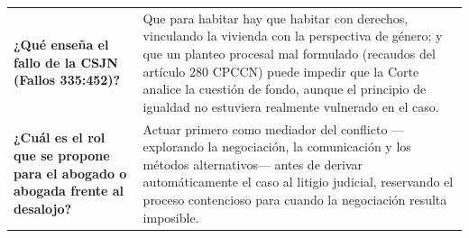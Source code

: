 \documentclass[12pt,oneside]{book}
\begin{document}
\begin{longtable}{
    >{\raggedright\arraybackslash}p{}
    >{\raggedright\arraybackslash}p{}
}
\textbf{¿Qué enseña el fallo de la CSJN (Fallos 335:452)?} &
Que para habitar hay que habitar con derechos, vinculando la vivienda con la perspectiva de género; y que un planteo procesal mal formulado (recaudos del artículo 280 CPCCN) puede impedir que la Corte analice la cuestión de fondo, aunque el principio de igualdad no estuviera realmente vulnerado en el caso. \\

\textbf{¿Cuál es el rol que se propone para el abogado o abogada frente al desalojo?} &
Actuar primero como mediador del conflicto —explorando la negociación, la comunicación y los métodos alternativos— antes de derivar automáticamente el caso al litigio judicial, reservando el proceso contencioso para cuando la negociación resulta imposible. \\


\end{longtable}
\end{document}

